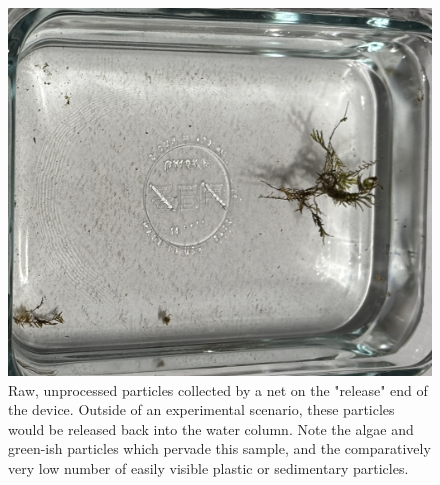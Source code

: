 \documentclass[fleqn,10pt]{SelfArx} %
\begin{document}
	\begin{figure}[h]
		\centering
		\includegraphics[angle=90,origin=c,width=1\linewidth]{Figures/RawReleased}
		\caption[Raw Released Particles]{Raw, unprocessed particles collected by a net on the "release" end of the device. Outside of an experimental scenario, these particles would be released back into the water column. Note the algae and green-ish particles which pervade this sample, and the comparatively very low number of easily visible plastic or sedimentary particles.}
		\label{fig:rawreleased}
	\end{figure}
	
\end{document}
